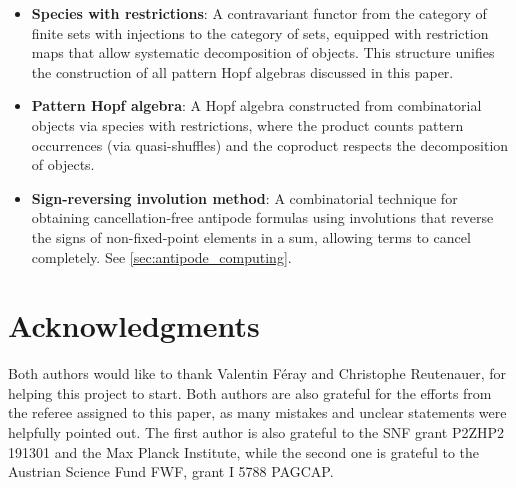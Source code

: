 \documentclass[12pt, reqno]{amsart}
\theoremstyle{definition}
\begin{document}
\begin{itemize}
\item \textbf{Species with restrictions}: A contravariant functor from the category of finite sets with injections to the category of sets, equipped with restriction maps that allow systematic decomposition of objects. This structure unifies the construction of all pattern Hopf algebras discussed in this paper.

\item \textbf{Pattern Hopf algebra}: A Hopf algebra constructed from combinatorial objects via species with restrictions, where the product counts pattern occurrences (via quasi-shuffles) and the coproduct respects the decomposition of objects.

\item \textbf{Sign-reversing involution method}: A combinatorial technique for obtaining cancellation-free antipode formulas using involutions that reverse the signs of non-fixed-point elements in a sum, allowing terms to cancel completely. See \cref{sec:antipode_computing}.

\end{itemize}

\section*{Acknowledgments}

Both authors would like to thank Valentin F\'eray and Christophe Reutenauer, for helping this project to start.
Both authors are also grateful for the efforts from the referee assigned to this paper, as many mistakes and unclear statements were helpfully pointed out.
The first author is also grateful to the SNF grant P2ZHP2 191301 and the Max Planck Institute, while the second one is grateful to the Austrian Science Fund FWF, grant I 5788 PAGCAP.


%
%
\end{document}
